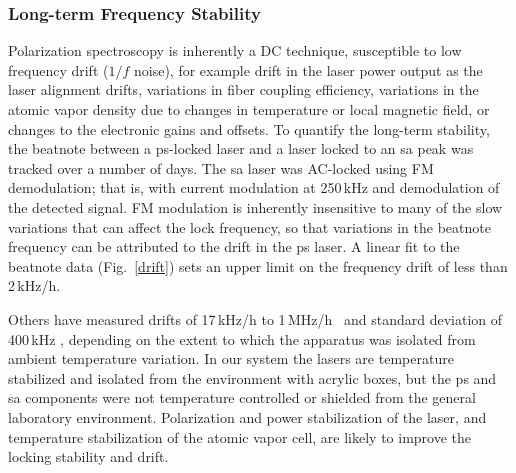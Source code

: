 \subsubsection{Long-term Frequency Stability}
Polarization spectroscopy is inherently a DC technique, susceptible to low frequency drift ($1/f$ noise), for example drift in the laser power output as the laser alignment drifts, variations in fiber coupling efficiency, variations in the atomic vapor density due to changes in temperature or local magnetic field, or changes to the electronic gains and offsets.  To quantify the long-term stability, the beatnote between a \gls*{ps}-locked laser and a laser locked to an \gls*{sa} peak was tracked over a number of days.  The \gls*{sa} laser was AC-locked using FM demodulation; that is, with current modulation at 250\,kHz and demodulation of the detected signal.  FM modulation is inherently insensitive to many of the slow variations that can affect the lock frequency, so that variations in the beatnote frequency can be attributed to the drift in the \gls*{ps} laser. A linear fit to the beatnote data (Fig.~\ref{drift}) sets an upper limit on the frequency drift of less than 2\,kHz/h. 

Others have measured drifts of 17\,kHz/h to 1\,MHz/h~\cite{yoshikawa_frequency_2003, tiwari_laser_2006} and standard deviation of 400\,kHz \cite{lee_frequency_2014}, depending on the extent to which the apparatus was isolated from ambient temperature variation. In our system the lasers are temperature stabilized and isolated from the environment with acrylic boxes, but the \gls*{ps} and \gls*{sa} components were not temperature controlled or shielded from the general laboratory environment.  Polarization and power stabilization of the laser, and temperature stabilization of the atomic vapor cell, are likely to improve the locking stability and drift.

